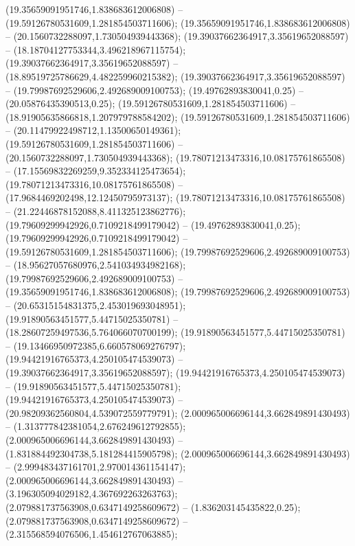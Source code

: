  (19.35659091951746,1.838683612006808) -- (19.59126780531609,1.281854503711606);
 (19.35659091951746,1.838683612006808) -- (20.1560732288097,1.730504939443368);
 (19.39037662364917,3.35619652088597) -- (18.18704127753344,3.496218967115754);
 (19.39037662364917,3.35619652088597) -- (18.89519725786629,4.482259960215382);
 (19.39037662364917,3.35619652088597) -- (19.79987692529606,2.492689009100753);
 (19.49762893830041,0.25) -- (20.05876435390513,0.25);
 (19.59126780531609,1.281854503711606) -- (18.91905635866818,1.207979788584202);
 (19.59126780531609,1.281854503711606) -- (20.11479922498712,1.13500650149361);
 (19.59126780531609,1.281854503711606) -- (20.1560732288097,1.730504939443368);
 (19.78071213473316,10.08175761865508) -- (17.15569832269259,9.352334125473654);
 (19.78071213473316,10.08175761865508) -- (17.9684469202498,12.12450795973137);
 (19.78071213473316,10.08175761865508) -- (21.22446878152088,8.411325123862776);
 (19.79609299942926,0.7109218499179042) -- (19.49762893830041,0.25);
 (19.79609299942926,0.7109218499179042) -- (19.59126780531609,1.281854503711606);
 (19.79987692529606,2.492689009100753) -- (18.95627057680976,2.541034934982168);
 (19.79987692529606,2.492689009100753) -- (19.35659091951746,1.838683612006808);
 (19.79987692529606,2.492689009100753) -- (20.65315154831375,2.453019693048951);
 (19.91890563451577,5.44715025350781) -- (18.28607259497536,5.764066070700199);
 (19.91890563451577,5.44715025350781) -- (19.13466950972385,6.660578069276797);
 (19.94421916765373,4.250105474539073) -- (19.39037662364917,3.35619652088597);
 (19.94421916765373,4.250105474539073) -- (19.91890563451577,5.44715025350781);
 (19.94421916765373,4.250105474539073) -- (20.98209362560804,4.539072559779791);
 (2.000965006696144,3.662849891430493) -- (1.313777842381054,2.676249612792855);
 (2.000965006696144,3.662849891430493) -- (1.831884492304738,5.181284415905798);
 (2.000965006696144,3.662849891430493) -- (2.999483437161701,2.970014361154147);
 (2.000965006696144,3.662849891430493) -- (3.196305094029182,4.367692263263763);
 (2.079881737563908,0.6347149258609672) -- (1.836203145435822,0.25);
 (2.079881737563908,0.6347149258609672) -- (2.315568594076506,1.454612767063885);
